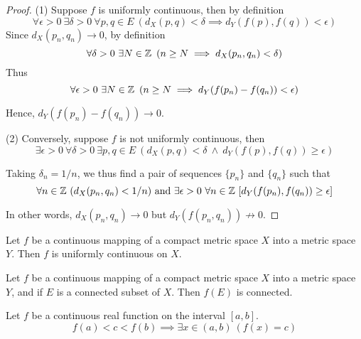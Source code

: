     \begin{framed}
        \begin{proof}
            (1) Suppose $f$ is uniformly continuous, then by definition
            \begin{equation}
                \forall \epsilon > 0 \ \exists \delta > 0 \ \forall p,q \in E \ \left(d_X(p,q) < \delta \implies d_Y(f(p),f(q)) < \epsilon \right)
            \end{equation}
            Since $d_X(p_n, q_n) \to 0$, by definition
            \begin{equation}
                \forall \delta > 0 \ \exists N \in \Z \ \left( n \geq N \implies d_X(p_n, q_n) < \delta \right)
            \end{equation}
            Thus
            \begin{equation}
                \forall \epsilon > 0 \ \exists N \in \mathbb{Z} \ \left( n \geq N \implies d_Y(f(p_n) - f(q_n)) < \epsilon \right)
            \end{equation}
    
            Hence, $d_Y(f(p_n) - f(q_n)) \to 0$.

            (2) Conversely, suppose $f$ is not uniformly continuous, then
            \begin{equation}
                \exists \epsilon > 0 \ \forall \delta > 0 \ \exists p,q\in E \ \left( d_X(p,q) < \delta \ \land \ d_Y(f(p),f(q)) \geq \epsilon \right) 
            \end{equation}
            
            Taking $\delta_n = 1/n$, we thus find a pair of sequences $\{p_n\}$ and $\{q_n\}$ such that
            \begin{equation}
                \forall n \in \Z \ (d_X(p_n, q_n) < 1/n) \text{ and } \exists \epsilon > 0 \ \forall n \in \Z \ [d_Y(f(p_n), f(q_n)) \geq \epsilon]
            \end{equation}

            In other words, $d_X(p_n, q_n) \to 0$ but $d_Y(f(p_n, q_n)) \not\to 0$.
        \end{proof}
    \end{framed}

    \begin{theo}
        Let $f$ be a continuous mapping of a compact metric space $X$ into a metric space $Y$. Then $f$ is uniformly continuous on $X$.
    \end{theo}

    \begin{theo}
        Let $f$ be a continuous mapping of a compact metric space $X$ into a metric space $Y$, and if $E$ is a connected subset of $X$. Then $f(E)$ is connected.
    \end{theo}

    \begin{theo}
        Let $f$ be a continuous real function on the interval $[a,b]$.
        \begin{equation}
            f(a) < c < f(b) \implies \exists x \in (a,b) \ \left( f(x)=c \right)
        \end{equation}
    \end{theo}
